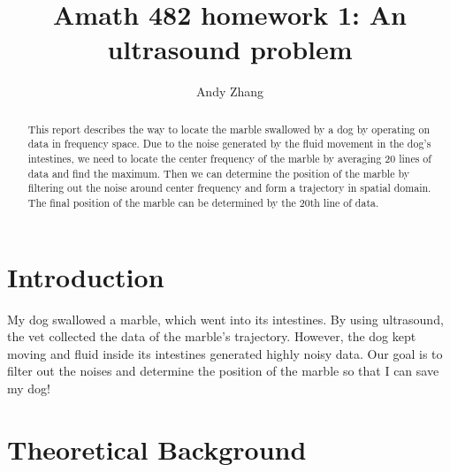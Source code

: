 \documentclass[10pt]{article}
\begin{document}
\title{Amath 482 homework 1: An ultrasound problem}
\author{Andy Zhang}
\maketitle

\begin{abstract}
This report describes the way to locate the marble swallowed by a dog by operating on data in frequency space. Due to the noise generated by the fluid movement in the dog's intestines, we need to locate the center frequency of the marble by averaging 20 lines of data and find the maximum. Then we can determine the position of the marble by filtering out the noise around center frequency and form a trajectory in spatial domain. The final position of the marble can be determined by the 20th line of data.

\end{abstract}

\section{Introduction}
My dog swallowed a marble, which went into its intestines. By using ultrasound, the vet collected the data of the marble's trajectory. However, the dog kept moving and fluid inside its intestines generated highly noisy data. Our goal is to filter out the noises and determine the position of the marble so that I can save my dog!


\section{Theoretical Background}
\end{document}
